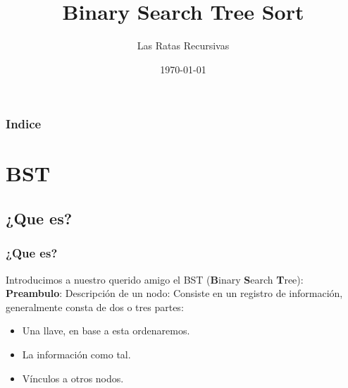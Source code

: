 \documentclass{beamer}
\title[BSTSort]{Binary Search Tree Sort} %
\author{Las Ratas Recursivas} %
\institute[UTEM] %
{
Universidad Tecnológica Metropolitana \\ %
\medskip
\textit{https://github.com/RatasRecursivas} %
}
\date{\today} %
\begin{document}
\begin{frame}
\titlepage %
\end{frame}

\begin{frame}
\frametitle{Indice} %
\tableofcontents %
\end{frame}


\section{BST} %

\subsection{¿Que es?} %

\begin{frame}
\frametitle{¿Que es?}
Introducimos a nuestro querido amigo el BST (\textbf{B}inary \textbf{S}earch \textbf{T}ree):\\
\textbf{Preambulo}: Descripción de un nodo: Consiste en un registro de información, generalmente consta de dos o tres partes:
\begin{itemize}
	\item Una llave, en base a esta ordenaremos.
	\item La información como tal.
	\item Vínculos a otros nodos.
\end{itemize}
\end{frame}
\end{document}
